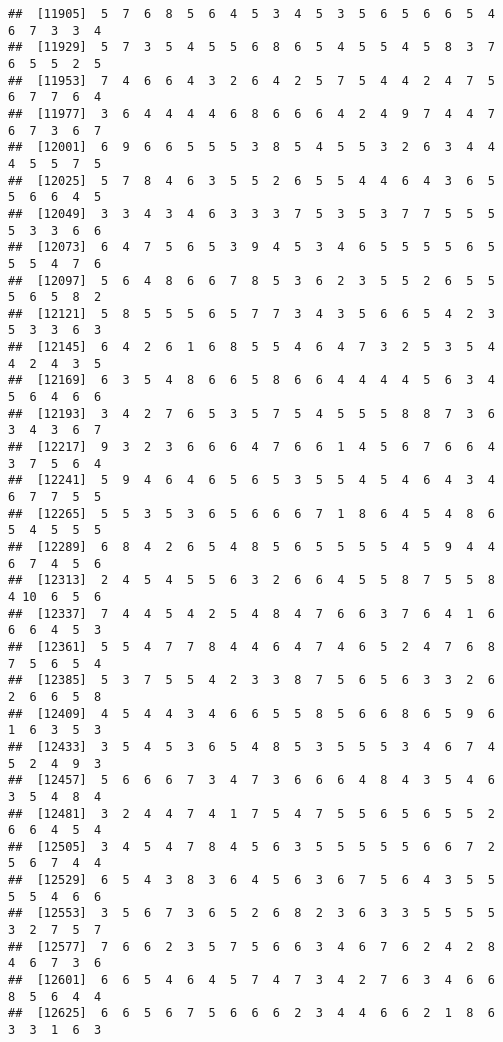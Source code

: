 \documentclass[
]{book}
\begin{document}
\begin{verbatim}
##  [11905]  5  7  6  8  5  6  4  5  3  4  5  3  5  6  5  6  6  5  4  6  7  3  3  4
##  [11929]  5  7  3  5  4  5  5  6  8  6  5  4  5  5  4  5  8  3  7  6  5  5  2  5
##  [11953]  7  4  6  6  4  3  2  6  4  2  5  7  5  4  4  2  4  7  5  6  7  7  6  4
##  [11977]  3  6  4  4  4  4  6  8  6  6  6  4  2  4  9  7  4  4  7  6  7  3  6  7
##  [12001]  6  9  6  6  5  5  5  3  8  5  4  5  5  3  2  6  3  4  4  4  5  5  7  5
##  [12025]  5  7  8  4  6  3  5  5  2  6  5  5  4  4  6  4  3  6  5  5  6  6  4  5
##  [12049]  3  3  4  3  4  6  3  3  3  7  5  3  5  3  7  7  5  5  5  5  3  3  6  6
##  [12073]  6  4  7  5  6  5  3  9  4  5  3  4  6  5  5  5  5  6  5  5  5  4  7  6
##  [12097]  5  6  4  8  6  6  7  8  5  3  6  2  3  5  5  2  6  5  5  5  6  5  8  2
##  [12121]  5  8  5  5  5  6  5  7  7  3  4  3  5  6  6  5  4  2  3  5  3  3  6  3
##  [12145]  6  4  2  6  1  6  8  5  5  4  6  4  7  3  2  5  3  5  4  4  2  4  3  5
##  [12169]  6  3  5  4  8  6  6  5  8  6  6  4  4  4  4  5  6  3  4  5  6  4  6  6
##  [12193]  3  4  2  7  6  5  3  5  7  5  4  5  5  5  8  8  7  3  6  3  4  3  6  7
##  [12217]  9  3  2  3  6  6  6  4  7  6  6  1  4  5  6  7  6  6  4  3  7  5  6  4
##  [12241]  5  9  4  6  4  6  5  6  5  3  5  5  4  5  4  6  4  3  4  6  7  7  5  5
##  [12265]  5  5  3  5  3  6  5  6  6  6  7  1  8  6  4  5  4  8  6  5  4  5  5  5
##  [12289]  6  8  4  2  6  5  4  8  5  6  5  5  5  5  4  5  9  4  4  6  7  4  5  6
##  [12313]  2  4  5  4  5  5  6  3  2  6  6  4  5  5  8  7  5  5  8  4 10  6  5  6
##  [12337]  7  4  4  5  4  2  5  4  8  4  7  6  6  3  7  6  4  1  6  6  6  4  5  3
##  [12361]  5  5  4  7  7  8  4  4  6  4  7  4  6  5  2  4  7  6  8  7  5  6  5  4
##  [12385]  5  3  7  5  5  4  2  3  3  8  7  5  6  5  6  3  3  2  6  2  6  6  5  8
##  [12409]  4  5  4  4  3  4  6  6  5  5  8  5  6  6  8  6  5  9  6  1  6  3  5  3
##  [12433]  3  5  4  5  3  6  5  4  8  5  3  5  5  5  3  4  6  7  4  5  2  4  9  3
##  [12457]  5  6  6  6  7  3  4  7  3  6  6  6  4  8  4  3  5  4  6  3  5  4  8  4
##  [12481]  3  2  4  4  7  4  1  7  5  4  7  5  5  6  5  6  5  5  2  6  6  4  5  4
##  [12505]  3  4  5  4  7  8  4  5  6  3  5  5  5  5  5  6  6  7  2  5  6  7  4  4
##  [12529]  6  5  4  3  8  3  6  4  5  6  3  6  7  5  6  4  3  5  5  5  5  4  6  6
##  [12553]  3  5  6  7  3  6  5  2  6  8  2  3  6  3  3  5  5  5  5  3  2  7  5  7
##  [12577]  7  6  6  2  3  5  7  5  6  6  3  4  6  7  6  2  4  2  8  4  6  7  3  6
##  [12601]  6  6  5  4  6  4  5  7  4  7  3  4  2  7  6  3  4  6  6  8  5  6  4  4
##  [12625]  6  6  5  6  7  5  6  6  6  2  3  4  4  6  6  2  1  8  6  3  3  1  6  3

\end{verbatim}
\end{document}
